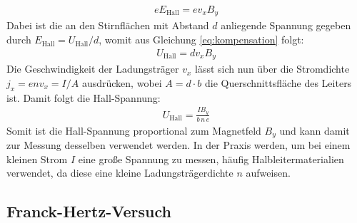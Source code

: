 \documentclass[11pt, a4paper]{article}
\begin{document}
\begin{align*}
	e E_\mathrm{Hall} = e v_x B_y
	\label{eq:kompensation}
\end{align*}
Dabei ist die an den Stirnflächen mit Abstand $d$ anliegende Spannung gegeben durch $E_\mathrm{Hall} = U_\mathrm{Hall} / d$, womit aus Gleichung \ref{eq:kompensation} folgt:
\begin{align*}
	U_\mathrm{Hall} = d v_x B_y
\end{align*}
Die Geschwindigkeit der Ladungsträger $v_x$ lässt sich nun über die Stromdichte $j_x = e n v_x = I/A$ ausdrücken, wobei $A = d \cdot b$ die Querschnittsfläche des Leiters ist.
Damit folgt die Hall-Spannung:
\begin{align*}
	U_\mathrm{Hall} = \frac{I B_y}{b\, n\, e}
\end{align*}
Somit ist die Hall-Spannung proportional zum Magnetfeld $B_y$ und kann damit zur Messung desselben verwendet werden.
In der Praxis werden, um bei einem kleinen Strom $I$ eine große Spannung zu messen, häufig Halbleitermaterialien verwendet, da diese eine kleine Ladungsträgerdichte $n$ aufweisen.


\subsection{Franck-Hertz-Versuch}
\end{document}
